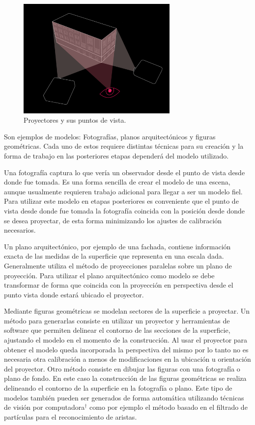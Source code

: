 \begin{figure}[H]
  \centering
    \includegraphics[width=0.7\textwidth]{./Cap2_videomapping/diagrama-2proyectores}
  \caption[http://vvvv.org]{Proyectores y sus puntos de vista.}
  \label{fig:diagrama-2proyectores}
\end{figure}

Son ejemplos de modelos: Fotografías, planos arquitectónicos y figuras geométricas.
Cada uno de estos requiere distintas técnicas para su creación y la forma de trabajo en las posteriores etapas dependerá del modelo utilizado.

Una fotografía captura lo que vería un observador desde el punto de vista desde donde fue tomada. Es una forma sencilla de crear el modelo de una escena, aunque usualmente requieren trabajo adicional para llegar a ser un modelo fiel. Para utilizar este modelo en etapas posteriores es conveniente que el punto de vista desde donde fue tomada la fotografía coincida con la posición desde donde se desea proyectar, de esta forma minimizando los ajustes de calibración necesarios.

Un plano arquitectónico, por ejemplo de una fachada, contiene información exacta de las medidas de la superficie que representa en una escala dada. Generalmente utiliza el método de proyecciones paralelas \cite{LibroCompGrafica} sobre un plano de proyección. Para utilizar el plano arquitectónico como modelo se debe transformar de forma que coincida con la proyección en perspectiva desde el punto vista donde estará ubicado el proyector.

Mediante figuras geométricas se modelan sectores de la superficie a proyectar. Un método para generarlas consiste en utilizar un proyector y herramientas de software que permiten delinear el contorno de las secciones de la superficie, ajustando el modelo en el momento de la construcción. Al usar el proyector para obtener el modelo queda incorporada la perspectiva del mismo por lo tanto no es necesaria otra calibración a menos de modificaciones en la ubicación u orientación del proyector.
Otro método consiste en dibujar las figuras con una fotografía o plano de fondo. En este caso la construcción de las figuras geométricas se realiza delineando el contorno de la superficie en la fotografía o plano.
Este tipo de modelos también pueden ser generados de forma automática utilizando técnicas de visión por computadora$^\dagger$ como por ejemplo el método basado en el filtrado de partículas\cite{ArticuloAutom2dmodel} para el reconocimiento de aristas.

